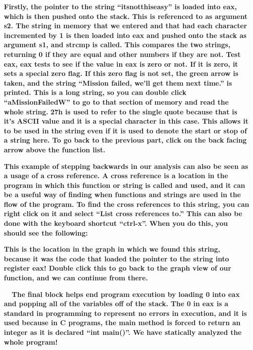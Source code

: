   
 \textbf{Firstly, the pointer to the string ``itsnotthiseasy'' is loaded into eax, which is then pushed onto the stack.
This is referenced to as argument s2. The string in memory that we entered and that had each character incremented by 1
is then loaded into eax and pushed onto the stack as argument s1, and strcmp is called. This compares the two strings,
returning 0 if they are equal and other numbers if they are not. Test eax, eax tests to see if the value in eax is zero
or not. If it is zero, it sets a special zero flag. If this zero flag is not set, the green arrow is taken, and the
string ``Mission failed, we'll get them next time.'' is printed. This is a long string, so you can double click
``aMissionFailedW'' to go to that section of memory and read the whole string.}  
 \textbf{27h is used to refer to the single quote because that is it's ASCII value and it is a special character in this
case. This allows it to be used in the string even if it is used to denote the start or stop of a string here. To go
back to the previous part, click on the back facing arrow above the function list.}

  
 \textbf{\newline
This example of stepping backwards in our analysis can also be seen as a usage of a cross reference. A cross reference
is a location in the program in which this function or string is called and used, and it can be a useful way of finding
when functions and strings are used in the flow of the program. To find the cross references to this string, you can
right click on it and select ``List cross references to.'' This can also be done with the keyboard shortcut ``ctrl-x''.
When you do this, you should see the following:}

  
 

\textbf{This is the location in the graph in which we found this string, because it was the code that loaded the pointer
to the string into register eax! Double click this to go back to the graph view of our function, and we can continue
from there.}

\textbf{ \ \ The final block helps end program execution by loading 0 into eax and popping all of the variables off of
the stack. The 0 in eax is a standard in programming to represent no errors in execution, and it is used because in C
programs, the main method is forced to return an integer as it is declared ``int main()''. We have statically analyzed
the whole program!}

